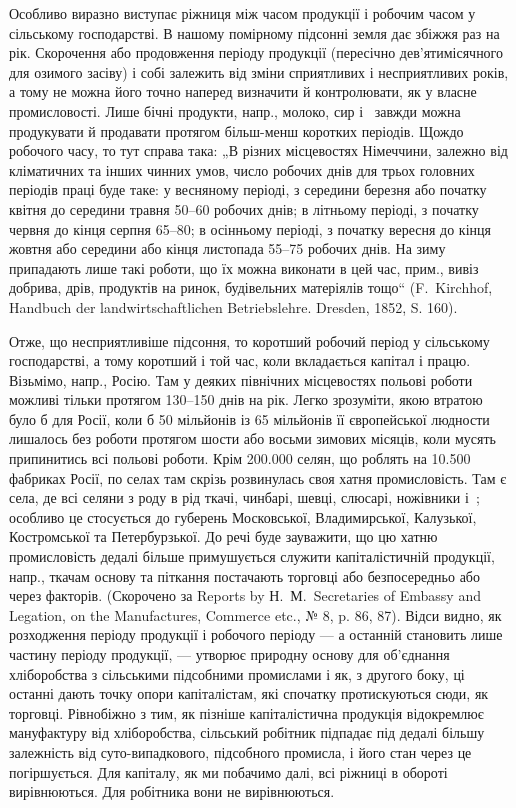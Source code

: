 Особливо виразно виступає ріжниця між часом продукції і робочим
часом у сільському господарстві. В нашому помірному підсонні земля дає
збіжжя раз на рік. Скорочення або продовження періоду продукції (пересічно
дев’ятимісячного для озимого засіву) і собі залежить від зміни
сприятливих і несприятливих років, а тому не можна його точно наперед
визначити й контролювати, як у власне промисловості. Лише бічні продукти,
напр., молоко, сир і~ завжди можна продукувати й продавати
протягом більш-менш коротких періодів. Щождо робочого часу, то тут
справа така: „В різних місцевостях Німеччини, залежно від кліматичних
та інших чинних умов, число робочих днів для трьох головних періодів
праці буде таке: у весняному періоді, з середини березня або початку
квітня до середини травня 50--60 робочих днів; в літньому періоді, з початку
червня до кінця серпня 65--80; в осінньому періоді, з початку
вересня до кінця жовтня або середини або кінця листопада 55--75 робочих
днів. На зиму припадають лише такі роботи, що їх можна виконати
в цей час, прим., вивіз добрива, дрів, продуктів на ринок, будівельних
матеріялів тощо“ (F.~Kirchhof, Handbuch der landwirtschaftlichen
Betriebslehre. Dresden, 1852, S. 160).

Отже, що несприятливіше підсоння, то коротший робочий період у
сільському господарстві, а тому коротший і той час, коли вкладається
капітал і працю. Візьмімо, напр., Росію. Там у деяких північних місцевостях
польові роботи можливі тільки протягом 130--150 днів на рік.
Легко зрозуміти, якою втратою було б для Росії, коли б 50 мільйонів
із 65 мільйонів її європейської людности лишалось без роботи протягом
шости або восьми зимових місяців, коли мусять припинитись всі польові
роботи. Крім \num{200.000} селян, що роблять на \num{10.500} фабриках Росії, по
селах там скрізь розвинулась своя хатня промисловість. Там є села, де
всі селяни з роду в рід ткачі, чинбарі, шевці, слюсарі, ножівники і~; особливо це стосується до губерень Московської, Владимирської, Калузької,
Костромської та Петербурзької. До речі буде зауважити, що цю
хатню промисловість дедалі більше примушується служити капіталістичній
продукції, напр., ткачам основу та піткання постачають торговці або
безпосередньо або через факторів. (Скорочено за Reports by Н.~М.~Secretaries
of Embassy and Legation, on the Manufactures, Commerce etc.,
№ 8, p. 86, 87). Відси видно, як розходження періоду продукції і робочого
періоду — а останній становить лише частину періоду продукції, —
утворює природну основу для об’єднання хліборобства з сільськими підсобними
промислами і як, з другого боку, ці останні дають точку опори
капіталістам, які спочатку протискуються сюди, як торговці. Рівнобіжно
з тим, як пізніше капіталістична продукція відокремлює мануфактуру від
хліборобства, сільський робітник підпадає під дедалі більшу залежність
від суто-випадкового, підсобного промисла, і його стан через це погіршується.
Для капіталу, як ми побачимо далі, всі ріжниці в обороті вирівнюються.
Для робітника вони не вирівнюються.

